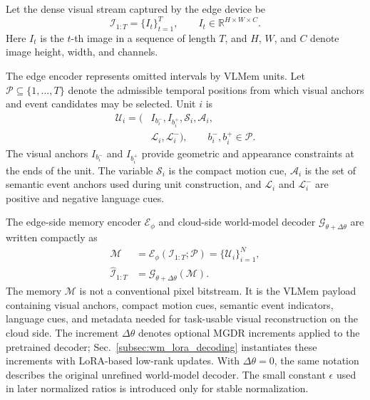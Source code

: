 Let the dense visual stream captured by the edge device be
\begin{equation}
\mathcal{I}_{1:T}
=\{I_t\}_{t=1}^{T},\qquad
I_t\in\mathbb{R}^{H\times W\times C}.
\label{eq:dense_stream}
\end{equation}
Here \(I_t\) is the \(t\)-th image in a sequence of length \(T\), and \(H\), \(W\), and \(C\) denote image height, width, and channels.

The edge encoder represents omitted intervals by VLMem units. Let \(\mathcal{P}\subseteq\{1,\ldots,T\}\) denote the admissible temporal positions from which visual anchors and event candidates may be selected. Unit \(i\) is
\begin{equation}
\begin{aligned}
\mathcal{U}_i
=\big(&I_{b_i^-},I_{b_i^+},\mathcal{S}_i,\mathcal{A}_i,\\
&\mathcal{L}_i,\mathcal{L}_i^{-}\big),\qquad
b_i^-,b_i^+\in\mathcal{P}.
\end{aligned}
\label{eq:vl_memory_unit}
\end{equation}
The visual anchors \(I_{b_i^-}\) and \(I_{b_i^+}\) provide geometric and appearance constraints at the ends of the unit. The variable \(\mathcal{S}_i\) is the compact motion cue, \(\mathcal{A}_i\) is the set of semantic event anchors used during unit construction, and \(\mathcal{L}_i\) and \(\mathcal{L}_i^{-}\) are positive and negative language cues.

The edge-side memory encoder \(\mathcal{E}_{\phi}\) and cloud-side world-model decoder \(\mathcal{G}_{\theta+\Delta\theta}\) are written compactly as
\begin{equation}
\begin{aligned}
\mathcal{M}
&=\mathcal{E}_{\phi}(\mathcal{I}_{1:T};\mathcal{P})
=\{\mathcal{U}_i\}_{i=1}^{N},\\
\widehat{\mathcal{I}}_{1:T}
&=\mathcal{G}_{\theta+\Delta\theta}(\mathcal{M}).
\end{aligned}
\label{eq:memory_coding}
\end{equation}
The memory \(\mathcal{M}\) is not a conventional pixel bitstream. It is the VLMem payload containing visual anchors, compact motion cues, semantic event indicators, language cues, and metadata needed for task-usable visual reconstruction on the cloud side. The increment \(\Delta\theta\) denotes optional MGDR increments applied to the pretrained decoder; Sec.~\ref{subsec:wm_lora_decoding} instantiates these increments with LoRA-based low-rank updates. With \(\Delta\theta=0\), the same notation describes the original unrefined world-model decoder. The small constant \(\epsilon\) used in later normalized ratios is introduced only for stable normalization.

